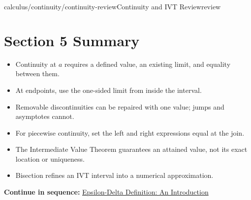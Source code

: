 \documentclass[11pt,openany]{book}
\theoremstyle{bgplain}
\newcommand{\webnext}[2]{%
  \par\addvspace{1.2em}\noindent{\color{BGLine}\rule{\textwidth}{0.35pt}}\par\smallskip
  {\small\color{BGGray}\textbf{Continue in sequence:} \hyperlink{web:#1}{#2}}\par
}
\begin{document}
\begin{webpage}{calculus/continuity/continuity-review}{Continuity and IVT Review}{review}
\section*{Section 5 Summary}

\begin{bgsummary}
\begin{itemize}
  \item Continuity at \(a\) requires a defined value, an existing limit, and equality between them.
  \item At endpoints, use the one-sided limit from inside the interval.
  \item Removable discontinuities can be repaired with one value; jumps and asymptotes cannot.
  \item For piecewise continuity, set the left and right expressions equal at the join.
  \item The Intermediate Value Theorem guarantees an attained value, not its exact location or uniqueness.
  \item Bisection refines an IVT interval into a numerical approximation.
\end{itemize}
\end{bgsummary}
\webnext{calculus/limits/epsilon-delta-introduction}{Epsilon-Delta Definition: An Introduction}
\end{webpage}
\end{document}
